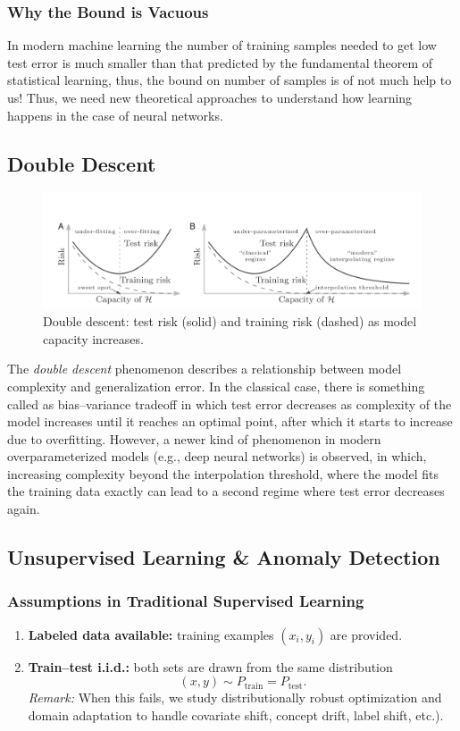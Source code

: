 \documentclass[11pt]{article}
\theoremstyle{plain}
\begin{document}
\subsubsection*{Why the Bound is Vacuous}
In modern machine learning the number of training samples needed to get low test error is much smaller than that predicted by the fundamental theorem of statistical learning, thus, the bound on number of samples is of not much help to us! Thus, we need new theoretical approaches to understand how learning happens in the case of neural networks.

\subsection{Double Descent}

\begin{figure}[ht]
  \centering
  \includegraphics[width=\linewidth]{DoubleDescent.png}
  \caption{Double descent: test risk (solid) and training risk (dashed) as model capacity increases.}
  \label{fig:double-descent}
\end{figure}

The \textit{double descent} phenomenon describes a relationship between model complexity and generalization error. 
In the classical case, there is something called as bias--variance tradeoff in which test error decreases as complexity of the model increases until it reaches an optimal point, after which it starts to increase due to overfitting.
However, a newer kind of phenomenon in modern overparameterized models (e.g., deep neural networks) is observed, in which, increasing complexity beyond the interpolation threshold, where the model fits the training data exactly can lead to a second regime where test error decreases again. 


\subsection{Unsupervised Learning \& Anomaly Detection}

\subsubsection{Assumptions in Traditional Supervised Learning}
\begin{enumerate}
  \item \textbf{Labeled data available:} training examples $(x_i,y_i)$ are provided.
  \item \textbf{Train--test i.i.d.:} both sets are drawn from the same distribution
  \[
    (x,y)\sim P_{\text{train}}=P_{\text{test}}.
  \]
  \textit{Remark:} When this fails, we study distributionally robust optimization and domain adaptation to handle covariate shift, concept drift, label shift, etc.).
\end{enumerate}
\end{document}
